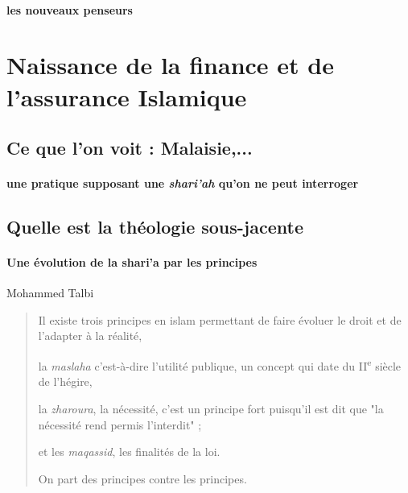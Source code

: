 \paragraph{les nouveaux penseurs}

\cite{Siddique:DemystifyingRiba}


\section{Naissance de la finance et de l'assurance Islamique}

\subsection{Ce que l'on voit : Malaisie,...} 

\paragraph{une pratique supposant une \textit{shari'ah} qu'on ne peut interroger}

\subsection{Quelle est la théologie sous-jacente}

\paragraph{Une évolution de la shari'a par les principes} Mohammed Talbi 
\begin{quote}
    Il existe
trois principes en islam permettant de faire évoluer le droit et de
l'adapter
à la réalité, 

la \emph{maslaha} c'est-à-dire l'utilité publique, un
concept qui date du II\textsuperscript{e} siècle de l'hégire, 

la
\emph{zharoura}, la nécessité, c'est un principe fort puisqu'il est dit
que "la nécessité rend permis l'interdit" ; 

et les \emph{maqassid}, les
finalités de la loi. 

\begin{Synthesis}
On part des principes contre les principes. 
\end{Synthesis}
\end{quote}


